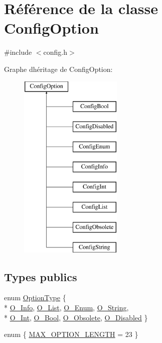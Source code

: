 \hypertarget{class_config_option}{}\section{Référence de la classe Config\+Option}
\label{class_config_option}


{\ttfamily \#include $<$config.\+h$>$}

Graphe d\textquotesingle{}héritage de Config\+Option\+:\begin{figure}[H]
\begin{center}
\leavevmode
\includegraphics[height=9.000000cm]{class_config_option}
\end{center}
\end{figure}
\subsection*{Types publics}
\begin{DoxyCompactItemize}
\item 
enum \hyperlink{class_config_option_ad60cb308cdf307e72796dc2fc2a40fda}{Option\+Type} \{ \\*
\hyperlink{class_config_option_ad60cb308cdf307e72796dc2fc2a40fdaade872bcb27f40e3380fb20be7cea9e57}{O\+\_\+\+Info}, 
\hyperlink{class_config_option_ad60cb308cdf307e72796dc2fc2a40fdaa18c0785bb1948fb57402ee80324ef1a7}{O\+\_\+\+List}, 
\hyperlink{class_config_option_ad60cb308cdf307e72796dc2fc2a40fdaa1ba2565ddffed94550a83a5b537e6a31}{O\+\_\+\+Enum}, 
\hyperlink{class_config_option_ad60cb308cdf307e72796dc2fc2a40fdaa3aa84b958a247d79889f28f4244a7d7f}{O\+\_\+\+String}, 
\\*
\hyperlink{class_config_option_ad60cb308cdf307e72796dc2fc2a40fdaac029c8062b88308de12914e88e12dcd8}{O\+\_\+\+Int}, 
\hyperlink{class_config_option_ad60cb308cdf307e72796dc2fc2a40fdaa306962172c18f2b309fb729e66e32e81}{O\+\_\+\+Bool}, 
\hyperlink{class_config_option_ad60cb308cdf307e72796dc2fc2a40fdaab60c019594029c214e601ec24988d6ac}{O\+\_\+\+Obsolete}, 
\hyperlink{class_config_option_ad60cb308cdf307e72796dc2fc2a40fdaa116df5f47c0442ad31ca0193cf540701}{O\+\_\+\+Disabled}
 \}
\item 
enum \{ \hyperlink{class_config_option_a7e6106faa6a60aebbb84ff484e4ec85faa40e4123355dbeb41dc6ca0c68c0d346}{M\+A\+X\+\_\+\+O\+P\+T\+I\+O\+N\+\_\+\+L\+E\+N\+G\+T\+H} = 23
 \}
\end{DoxyCompactItemize}
